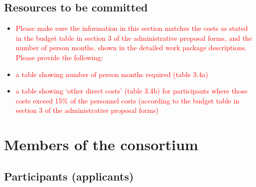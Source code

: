 \documentclass[11pt, a4paper]{article} %
\begin{document}
  
  \subsection{Resources to be committed}
 
  \begin{itemize}
  \item \textcolor{red}{Please make sure the information in this
      section matches the costs as stated in the budget table in
      section 3 of the administrative proposal forms, and the number
      of person months, shown in the detailed work package
      descriptions.  Please provide the following:}
 \item \textcolor{red}{a table showing number of person months required
    (table 3.4a)}
  \item \textcolor{red}{a table showing ‘other direct costs’ (table
      3.4b) for participants where those costs exceed 15\% of the
      personnel costs (according to the budget table in section 3 of
      the administrative proposal forms)}
\end{itemize}

  

\newpage

\section{Members of the consortium}

 \subsection{Participants (applicants)}
\end{document}
